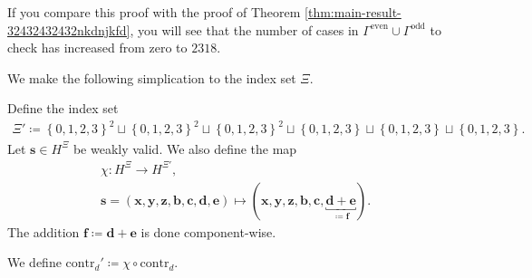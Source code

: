 \begin{remark}
    If you compare this proof with the proof of Theorem \ref{thm:main-result-32432432432nkdnjkfd}, you will see that the number of cases in \( \Gamma^{\mathrm{even}} \cup \Gamma^{\mathrm{odd}} \) to check has increased from zero to \( 2318 \).
\end{remark}

We make the following simplication to the index set \( \Xi \).

\begin{definition}
    Define the index set
    \begin{align*}
        \Xi' \coloneqq \left\{ 0,1,2,3 \right\}^2 \sqcup \left\{ 0,1,2,3 \right\}^2 \sqcup \left\{ 0,1,2,3 \right\}^2 \sqcup \left\{ 0,1,2,3 \right\} \sqcup \left\{ 0,1,2,3 \right\} \sqcup \left\{ 0,1,2,3 \right\}.
    \end{align*}
    Let \( \mathbf{s} \in H^{\Xi} \) be weakly valid. We also define the map
    \begin{gather*}
        \chi: H^\Xi \to H^{\Xi'},\\ \mathbf{s} = (\mathbf{x}, \mathbf{y}, \mathbf{z}, \mathbf{b}, \mathbf{c}, \mathbf{d}, \mathbf{e}) \mapsto (\mathbf{x}, \mathbf{y}, \mathbf{z}, \mathbf{b}, \mathbf{c}, \underbracket{\mathbf{d} + \mathbf{e}}_{\coloneqq \mathbf{f}}).
    \end{gather*}
    The addition \( \mathbf{f} \coloneqq \mathbf{d} + \mathbf{e} \) is done component-wise.
\end{definition}

\begin{definition}
    We define \( \mathrm{contr}_d' \coloneqq \chi \circ \mathrm{contr}_d \).
\end{definition}

